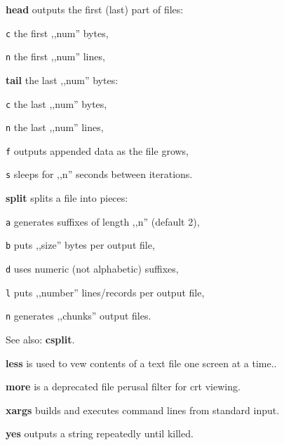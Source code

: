 \begin{enumx}
	\item [\cmdblack] \textbf{head} outputs the first (last) part of files:
	\item [\texttt{c}] the first ,,num'' bytes,
	\item [\texttt{n}] the first ,,num'' lines,
	\item [\cmdblack] \textbf{tail} the last ,,num'' bytes:
	\item [\texttt{c}] the last ,,num'' bytes,
	\item [\texttt{n}] the last ,,num'' lines,
	\item [\texttt{f}] outputs appended data as the file grows,
	\item [\texttt{s}] sleeps for ,,n'' seconds between iterations. 
	\item [\cmdblack] \textbf{split} splits a file into pieces:
	\item [\texttt{a}] generates suffixes of length ,,n'' (default 2),
	\item [\texttt{b}] puts ,,size'' bytes per output file,
	\item [\texttt{d}] uses numeric (not alphabetic) suffixes,
	\item [\texttt{l}] puts ,,number'' lines/records per output file,
	\item [\texttt{n}] generates ,,chunks'' output files.
	\item [\cmdblack] See also: \textbf{csplit}.
\end{enumx}

\begin{enumx}
	\item [\cmd] \textbf{less} is used to vew contents of a text file one screen at a time..
	\item [\cmd] \textbf{more} is a deprecated file perusal filter for crt viewing.
\end{enumx}


\begin{enumx}
	\item [\cmd] \textbf{xargs} builds and executes command lines from standard input.
\end{enumx}

\begin{enumx}
	\item [\cmd] \textbf{yes} outputs a string repeatedly until killed.
\end{enumx}

